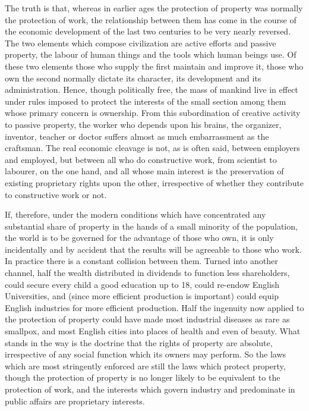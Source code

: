 \documentclass{book}
\begin{document}
The truth is that, whereas in earlier ages the protection of property was normally the protection of work, the relationship between them has come in the course of the economic development of the last two centuries to be very nearly reversed. The two elements which compose civilization are active efforts and passive property, the labour of human things and the tools which human beings use. Of these two elements those who supply the first maintain and improve it, those who own the second normally dictate its character, its development and its administration. Hence, though politically free, the mass of mankind live in effect under rules imposed to protect the interests of the small section among them whose primary concern is ownership. From this subordination of creative activity to passive property, the worker who depends upon his brains, the organizer, inventor, teacher or doctor suffers almost as much embarrassment as the craftsman. The real economic cleavage is not, as is often said, between employers and employed, but between all who do constructive work, from scientist to labourer, on the one hand, and all whose main interest is the preservation of existing proprietary rights upon the other, irrespective of whether they contribute to constructive work or not.

If, therefore, under the modern conditions which have concentrated any substantial share of property in the hands of a small minority of the population, the world is to be governed for the advantage of those who own, it is only incidentally and by accident that the results will be agreeable to those who work. In practice there is a constant collision between them. Turned into another channel, half the wealth distributed in dividends to function less shareholders, could secure every child a good education up to 18, could re-endow English Universities, and (since more efficient production is important) could equip English industries for more efficient production. Half the ingenuity now applied to the protection of property could have made most industrial diseases as rare as smallpox, and most English cities into places of health and even of beauty. What stands in the way is the doctrine that the rights of property are absolute, irrespective of any social function which its owners may perform. So the laws which are most stringently enforced are still the laws which protect property, though the protection of property is no longer likely to be equivalent to the protection of work, and the interests which govern industry and predominate in public affairs are proprietary interests.
\end{document}
